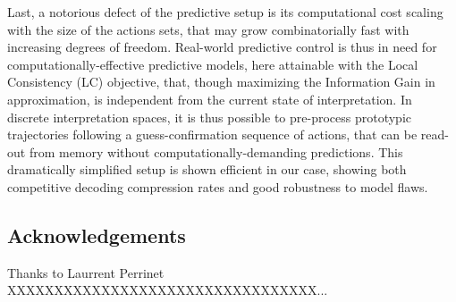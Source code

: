 \documentclass[12pt,twoside,openright]{article}
\begin{document}
Last, a notorious defect of the predictive setup is its computational cost scaling with the size of the actions sets, that may grow combinatorially fast with increasing degrees of freedom. Real-world predictive control is thus in need for computationally-effective predictive models, here attainable with the Local Consistency (LC) objective, that, though maximizing the Information Gain in approximation, is independent from the current state of interpretation. In discrete interpretation spaces, it is thus possible to pre-process prototypic trajectories following a guess-confirmation sequence of actions, that can be read-out from memory without computationally-demanding predictions. This dramatically simplified setup is shown efficient in our case, showing both competitive decoding compression rates and good robustness to model flaws. 

\subsection*{Acknowledgements}
Thanks to Laurrent Perrinet XXXXXXXXXXXXXXXXXXXXXXXXXXXXXXXXX...

\appendix
\end{document}
